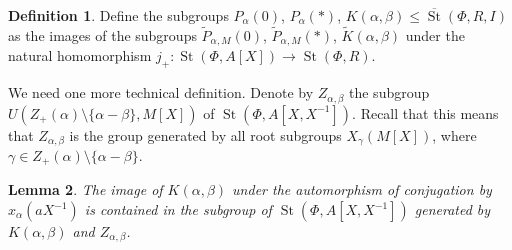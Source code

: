 \documentclass[oneside, 8pt]{amsart}
\newtheorem{lemma}{Lemma}
\theoremstyle{remark}
\theoremstyle{definition}
\numberwithin{lemma}{section}
\numberwithin{prop}{section}
\numberwithin{corollary}{section}
\numberwithin{externaltheorem}{section}
\newtheorem{df}[lemma]{Definition} \Crefname{df}{Definition}{Definitions}
\DeclareMathOperator{\St}{St}
\numberwithin{equation}{section}
\begin{document}
\begin{df} Define the subgroups $P_\alpha(0)$, $P_{\alpha}(*)$, $K(\alpha, \beta) \leq \overline{\St}(\Phi, R, I)$ as the images of the subgroups $\widetilde{P}_{\alpha, M}(0)$, $\widetilde{P}_{\alpha, M}(*)$, $\widetilde{K}(\alpha, \beta)$ under the natural homomorphism $j_+ \colon \St(\Phi, A[X]) \to \St(\Phi, R)$.\end{df}

We need one more technical definition. Denote by $Z_{\alpha, \beta}$ the subgroup $U(Z_+(\alpha) \setminus \{\alpha - \beta \}, M[X])$ of $\St(\Phi, A[X, X^{-1}])$.  Recall that this means that $Z_{\alpha, \beta}$ is the group generated by all root subgroups $X_\gamma(M[X])$, where $\gamma \in Z_+(\alpha) \setminus \{ \alpha - \beta \}$. 
  
\begin{lemma} \label{image-K-a-b} The image of $K(\alpha, \beta)$ under the automorphism of conjugation by $x_\alpha(aX^{-1})$ is contained in the subgroup of $\St(\Phi, A[X, X^{-1}])$ generated by $K(\alpha, \beta)$ and $Z_{\alpha, \beta}$. \end{lemma}
\end{document}
